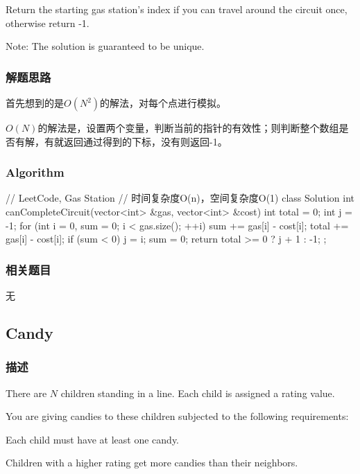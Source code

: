 Return the starting gas station's index if you can travel around the circuit 
once, otherwise return -1.

Note:
The solution is guaranteed to be unique.


\subsubsection{解题思路}
首先想到的是$O(N^2)$的解法，对每个点进行模拟。

$O(N)$的解法是，设置两个变量，判断当前的指针的有效性；则判断整个数组是否有解，有就返回通过得到的下标，没有则返回-1。


\subsubsection{Algorithm}
\begin{Code}
	// LeetCode, Gas Station
	// 时间复杂度O(n)，空间复杂度O(1)
	class Solution {
		int canCompleteCircuit(vector<int> &gas, vector<int> &cost) {
			int total = 0;
			int j = -1;
			for (int i = 0, sum = 0; i < gas.size(); ++i) {
				sum += gas[i] - cost[i];
				total += gas[i] - cost[i];
				if (sum < 0) {
					j = i;
					sum = 0;
				}
			}
			return total >= 0 ? j + 1 : -1;
		}
	};
\end{Code}


\subsubsection{相关题目}
\begindot
\item 无
\myenddot


\subsection{Candy} %
\label{sec:candy}


\subsubsection{描述}
There are $N$ children standing in a line. Each child is assigned a rating 
value.

You are giving candies to these children subjected to the following 
requirements:
\begindot
\item Each child must have at least one candy.
\item Children with a higher rating get more candies than their neighbors.
\myenddot

